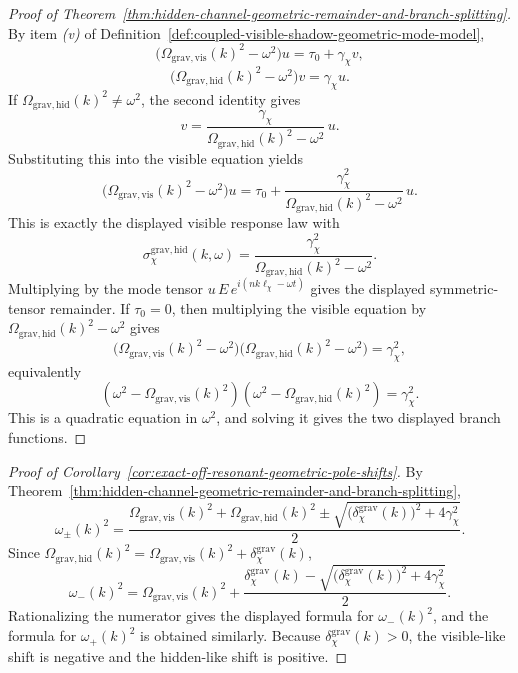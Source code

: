 \begin{proof}[Proof of Theorem~\ref{thm:hidden-channel-geometric-remainder-and-branch-splitting}]
\label{proof:thm:hidden-channel-geometric-remainder-and-branch-splitting}
By item \emph{(v)} of
Definition~\ref{def:coupled-visible-shadow-geometric-mode-model},
\[
\bigl(\Omega_{\mathrm{grav,vis}}(k)^2-\omega^2\bigr)u
=
\tau_0+\gamma_{\chi}v,
\]
\[
\bigl(\Omega_{\mathrm{grav,hid}}(k)^2-\omega^2\bigr)v
=
\gamma_{\chi}u.
\]
If \(\Omega_{\mathrm{grav,hid}}(k)^2\neq\omega^2\), the second identity gives
\[
v
=
\frac{\gamma_{\chi}}{\Omega_{\mathrm{grav,hid}}(k)^2-\omega^2}\,u.
\]
Substituting this into the visible equation yields
\[
\bigl(\Omega_{\mathrm{grav,vis}}(k)^2-\omega^2\bigr)u
=
\tau_0
+
\frac{\gamma_{\chi}^2}{\Omega_{\mathrm{grav,hid}}(k)^2-\omega^2}\,u.
\]
This is exactly the displayed visible response law with
\[
\sigma_{\chi}^{\mathrm{grav,hid}}(k,\omega)
=
\frac{\gamma_{\chi}^2}{\Omega_{\mathrm{grav,hid}}(k)^2-\omega^2}.
\]
Multiplying by the mode tensor
\(u\,E\,e^{i(nk\ell_{\chi}-\omega t)}\) gives the displayed symmetric-tensor
remainder. If \(\tau_0=0\), then multiplying the visible equation by
\(\Omega_{\mathrm{grav,hid}}(k)^2-\omega^2\) gives
\[
\bigl(\Omega_{\mathrm{grav,vis}}(k)^2-\omega^2\bigr)
\bigl(\Omega_{\mathrm{grav,hid}}(k)^2-\omega^2\bigr)
=
\gamma_{\chi}^2,
\]
equivalently
\[
(\omega^2-\Omega_{\mathrm{grav,vis}}(k)^2)
(\omega^2-\Omega_{\mathrm{grav,hid}}(k)^2)
=
\gamma_{\chi}^2.
\]
This is a quadratic equation in \(\omega^2\), and solving it gives the two
displayed branch functions.
\end{proof}

\begin{proof}[Proof of Corollary~\ref{cor:exact-off-resonant-geometric-pole-shifts}]
\label{proof:cor:exact-off-resonant-geometric-pole-shifts}
By Theorem~\ref{thm:hidden-channel-geometric-remainder-and-branch-splitting},
\[
\omega_{\pm}(k)^2
=
\frac{
\Omega_{\mathrm{grav,vis}}(k)^2+\Omega_{\mathrm{grav,hid}}(k)^2
\pm
\sqrt{
\bigl(\delta_{\chi}^{\mathrm{grav}}(k)\bigr)^2+4\gamma_{\chi}^2
}
}{2}.
\]
Since
\(\Omega_{\mathrm{grav,hid}}(k)^2=\Omega_{\mathrm{grav,vis}}(k)^2+\delta_{\chi}^{\mathrm{grav}}(k)\),
\[
\omega_-(k)^2
=
\Omega_{\mathrm{grav,vis}}(k)^2
+
\frac{
\delta_{\chi}^{\mathrm{grav}}(k)
-
\sqrt{
\bigl(\delta_{\chi}^{\mathrm{grav}}(k)\bigr)^2+4\gamma_{\chi}^2
}
}{2}.
\]
Rationalizing the numerator gives the displayed formula for \(\omega_-(k)^2\),
and the formula for \(\omega_+(k)^2\) is obtained similarly. Because
\(\delta_{\chi}^{\mathrm{grav}}(k)>0\), the visible-like shift is negative and
the hidden-like shift is positive.
\end{proof}

